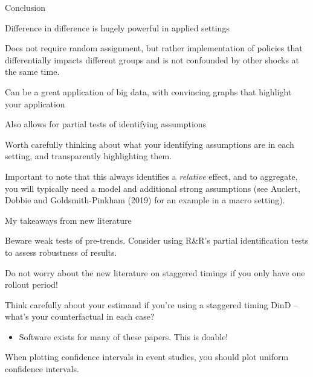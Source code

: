 \documentclass[notes,11pt, aspectratio=169]{beamer}
\newenvironment{wideitemize}{\itemize\addtolength{\itemsep}{10pt}}{\enditemize}
\begin{document}

\begin{frame}{Conclusion}
  \begin{wideitemize}
  \item Difference in difference is hugely powerful in applied settings
  \item Does not require random assignment, but rather implementation
    of policies that differentially impacts different groups and is
    not confounded by other shocks at the same time.
  \item Can be a great application of big data, with convincing graphs
    that highlight your application
  \item Also allows for partial tests of identifying assumptions
  \item Worth carefully thinking about what your identifying
    assumptions are in each setting, and transparently highlighting
    them.
  \item Important to note that this always identifies a
    \emph{relative} effect, and to aggregate, you will typically need
    a model and additional strong assumptions (see Auclert, Dobbie and
    Goldsmith-Pinkham (2019) for an example in a macro setting).
  \end{wideitemize}
\end{frame}

\begin{frame}{My takeaways from new literature}
  \begin{wideitemize}
  \item Beware weak tests of pre-trends. Consider using R\&R's
    partial identification tests to assess robustness of results.
  \item Do not worry about the new literature on staggered timings if you only have one rollout period!
  \item Think carefully about your estimand if you're using a staggered timing DinD -- what's your counterfactual in each case?
    \begin{itemize}
    \item Software exists for many of these papers. This is doable!
    \end{itemize}
  \item When plotting confidence intervals in event studies, you should plot uniform confidence intervals.
  \end{wideitemize}
\end{frame}
\end{document}
